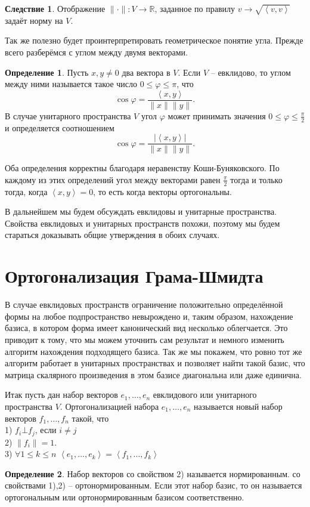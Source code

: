 \documentclass[10pt,a4paper,oneside]{book} %
\theoremstyle{definition}
\newtheorem*{defn}{Определение}
\newtheorem{cor}{Следствие}
\newcommand{\mb}[1]{\mathbb{#1}}
\def\ffi{\varphi}
\def\lan{\left\langle }
\def\ran{\right\rangle}
\def\dfn{\begin{defn}}
\def\edfn{\end{defn}}
\def\crl{\begin{cor}}
\def\ecrl{\end{cor}}
\begin{document}
\crl Отображение $\|\cdot\| \colon V \to \mb R$, заданное по правилу $v\to \sqrt{\lan v,v\ran}$ задаёт  норму на $V$.
\ecrl


Так же полезно будет проинтерпретировать геометрическое понятие угла. Прежде всего разберёмся с углом между двумя векторами.

\dfn Пусть $x,y\neq 0$ два вектора в $V$. Если $V$ -- евклидово, то углом между ними называется такое число $0\leq\ffi\leq \pi$, что 
$$\cos\ffi = \frac{\lan x,y\ran}{\|x\| \|y\|}.$$
В случае унитарного пространства $V$ угол $\ffi$ может принимать значения $0\leq \ffi \leq \frac{\pi}{2}$ и определяется соотношением
$$\cos\ffi = \frac{|\lan x,y\ran|}{\|x\| \|y\|}.$$
\edfn

Оба определения корректны благодаря неравенству Коши-Буняковского. По каждому из этих определений угол между векторами равен $\frac{\pi}{2}$ тогда и только тогда, когда $\lan x,y 
\ran=0$, то есть когда векторы ортогональны. 

В дальнейшем мы будем обсуждать  евклидовы и унитарные пространства. Свойства евклидовых и унитарных пространств похожи, поэтому  мы будем стараться доказывать общие утверждения в обоих случаях.


\section{Ортогонализация Грама-Шмидта}

В случае евклидовых пространств ограничение положительно определённой формы на любое подпространство невырождено и, таким образом, нахождение базиса, в котором форма имеет канонический вид несколько облегчается.  Это приводит к тому, что мы можем уточнить сам результат и немного изменить алгоритм нахождения подходящего базиса. Так же мы покажем, что ровно тот же алгоритм работает в унитарных пространствах и позволяет найти такой базис, что матрица скалярного произведения в этом базисе диагональна или даже единична.

Итак пусть дан набор векторов $e_1,\dots, e_n $ евклидового или унитарного пространства $V$. Ортогонализацией набора $e_1,\dots,e_n$ называется  новый набор векторов $f_1,\dots,f_n$ такой, что\\
1) $f_i \bot f_j$, если $i\neq j$\\
2) $\|f_i\|=1$.\\
3) $\forall 1\leq k\leq n\,\,\lan e_1,\dots,e_k\ran=\lan f_1,\dots,f_k\ran$\\


\dfn Набор векторов со свойством 2)
называется нормированным. со свойствами 1),2) -- ортонормированным. Если этот набор базис, то он называется ортогональным или ортонормированным базисом соответственно.
\edfn 
\end{document}
